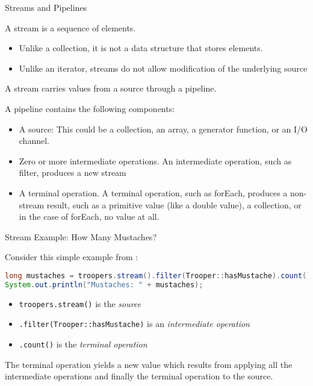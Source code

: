 \documentclass{beamer}
\begin{document}
\begin{frame}
  \titlepage
\end{frame}

\begin{frame}[fragile]{Streams and Pipelines}

A stream is a sequence of elements.
\begin{itemize}
\item Unlike a collection, it is not a data structure that stores elements.
\item Unlike an iterator, streams do not allow modification of the underlying source
\end{itemize}

A stream carries values from a source through a pipeline.\\

\vspace{.1in}

A pipeline contains the following components:

\begin{itemize}
\item A source: This could be a collection, an array, a generator function, or an I/O channel.
\item Zero or more intermediate operations. An intermediate operation, such as filter, produces a new stream
\item A terminal operation. A terminal operation, such as forEach, produces a non-stream result, such as a primitive value (like a double value), a collection, or in the case of forEach, no value at all.
\end{itemize}

\end{frame}

\begin{frame}[fragile]{Stream Example: How Many Mustaches?}

Consider this simple example from :
\begin{lstlisting}[language=Java]
long mustaches = troopers.stream().filter(Trooper::hasMustache).count();
System.out.println("Mustaches: " + mustaches);
\end{lstlisting}

\begin{itemize}
\item {\tt troopers.stream()} is the {\it source}
\item {\tt .filter(Trooper::hasMustache)} is an {\it intermediate operation}
\item {\tt .count()} is the {\it terminal operation}
\end{itemize}
The terminal operation yields a new value which results from applying all the intermediate operations and finally the terminal operation to the source.

\end{frame}
\end{document}
